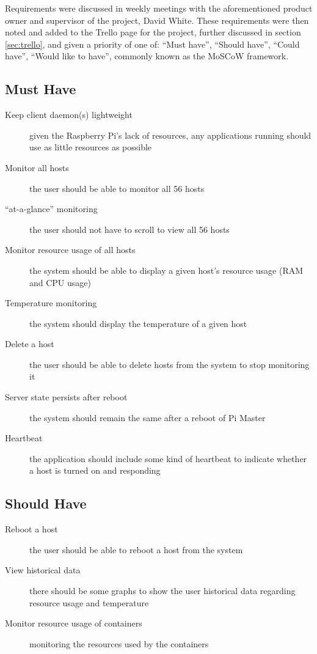 Requirements were discussed in weekly meetings with the aforementioned product owner and supervisor of the project, David White.
These requirements were then noted and added to the Trello page for the project, further discussed in section \ref{sec:trello}, and given a priority of one of: ``Must have'', ``Should have'', ``Could have'', ``Would like to have'', commonly known as the MoSCoW framework.

\subsection{Must Have}
\label{sec:musthave}
\begin{description}
	\item[Keep client daemon(s) lightweight] given the Raspberry Pi's lack of resources, any applications running should use as little resources as possible
	\item[Monitor all hosts] the user should be able to monitor all 56 hosts
	\item[``at-a-glance'' monitoring] the user should not have to scroll to view all 56 hosts
	\item[Monitor resource usage of all hosts] the system should be able to display a given host's resource usage (RAM and CPU usage)
	\item[Temperature monitoring] the system should display the temperature of a given host
	\item[Delete a host] the user should be able to delete hosts from the system to stop monitoring it
	\item[Server state persists after reboot] the system should remain the same after a reboot of Pi Master
	\item[Heartbeat] the application should include some kind of heartbeat to indicate whether a host is turned on and responding
\end{description}

\subsection{Should Have}
\label{sec:shouldhave}
\begin{description}
	\item[Reboot a host] the user should be able to reboot a host from the system
	\item[View historical data] there should be some graphs to show the user historical data regarding resource usage and temperature
	\item[Monitor resource usage of containers] monitoring the resources used by the containers
\end{description}


